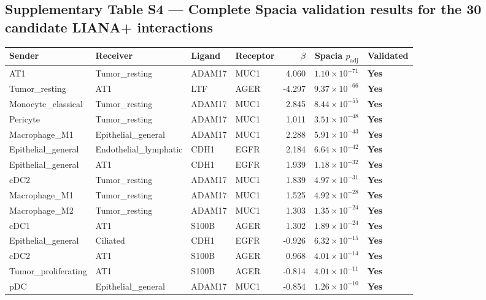 \documentclass[12pt,a4paper]{article}
\begin{document}
\subsection*{Supplementary Table S4 --- Complete Spacia validation results for the 30 candidate LIANA+ interactions}
\begin{table}[h!]
\centering
\small
\begin{tabular}{@{}llllrrl@{}}
\toprule
\textbf{Sender} & \textbf{Receiver} & \textbf{Ligand} & \textbf{Receptor} & \textbf{$\beta$} & \textbf{Spacia $p_{\text{adj}}$} & \textbf{Validated} \\
\midrule
AT1 & Tumor\_resting & ADAM17 & MUC1 & 4.060 & $1.10{\times}10^{-71}$ & \textbf{Yes} \\
Tumor\_resting & AT1 & LTF & AGER & -4.297 & $9.37{\times}10^{-66}$ & \textbf{Yes} \\
Monocyte\_classical & Tumor\_resting & ADAM17 & MUC1 & 2.845 & $8.44{\times}10^{-55}$ & \textbf{Yes} \\
Pericyte & Tumor\_resting & ADAM17 & MUC1 & 1.011 & $3.51{\times}10^{-48}$ & \textbf{Yes} \\
Macrophage\_M1 & Epithelial\_general & ADAM17 & MUC1 & 2.288 & $5.91{\times}10^{-43}$ & \textbf{Yes} \\
Epithelial\_general & Endothelial\_lymphatic & CDH1 & EGFR & 2.184 & $6.64{\times}10^{-42}$ & \textbf{Yes} \\
Epithelial\_general & AT1 & CDH1 & EGFR & 1.939 & $1.18{\times}10^{-32}$ & \textbf{Yes} \\
cDC2 & Tumor\_resting & ADAM17 & MUC1 & 1.839 & $4.97{\times}10^{-31}$ & \textbf{Yes} \\
Macrophage\_M1 & Tumor\_resting & ADAM17 & MUC1 & 1.525 & $4.92{\times}10^{-28}$ & \textbf{Yes} \\
Macrophage\_M2 & Tumor\_resting & ADAM17 & MUC1 & 1.303 & $1.35{\times}10^{-24}$ & \textbf{Yes} \\
cDC1 & AT1 & S100B & AGER & 1.302 & $1.89{\times}10^{-24}$ & \textbf{Yes} \\
Epithelial\_general & Ciliated & CDH1 & EGFR & -0.926 & $6.32{\times}10^{-15}$ & \textbf{Yes} \\
cDC2 & AT1 & S100B & AGER & 0.968 & $4.01{\times}10^{-14}$ & \textbf{Yes} \\
Tumor\_proliferating & AT1 & S100B & AGER & -0.814 & $4.01{\times}10^{-11}$ & \textbf{Yes} \\
pDC & Epithelial\_general & ADAM17 & MUC1 & -0.854 & $1.26{\times}10^{-10}$ & \textbf{Yes} \\

\end{tabular}
\end{table}
\end{document}
